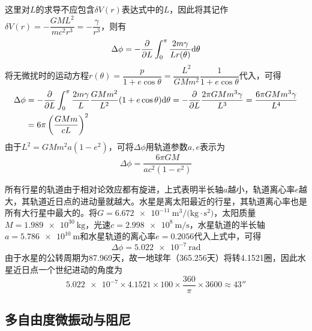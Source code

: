 \begin{solution}
\begin{equation*}
\end{equation*}
这里对$L$的求导不应包含$\delta V(r)$表达式中的$L$，因此将其记作$\delta V(r) = -\dfrac{GML^2}{mc^2r^3} = -\dfrac{\gamma}{r^3}$，则有
\begin{equation*}
	\Delta \phi = -\frac{\partial}{\partial L} \int_0^\pi \frac{2m\gamma}{Lr(\theta)} \mathrm{d} \theta
\end{equation*}
将无微扰时的运动方程$r(\theta) = \dfrac{p}{1+e\cos\theta} = \dfrac{L^2}{GMm^2} \dfrac{1}{1+e\cos\theta}$代入，可得
\begin{align*}
	\Delta \phi & = -\frac{\partial}{\partial L} \int_0^\pi \frac{2m\gamma}{L} \frac{GMm^2}{L^2}(1+e\cos\theta) \mathrm{d} \theta = -\frac{\partial}{\partial L} \frac{2\pi GMm^3\gamma}{L^3} = \frac{6\pi GMm^3\gamma}{L^4} \\
	& = 6\pi \left(\frac{GMm}{cL}\right)^2
\end{align*}
由于$L^2=GMm^2a(1-e^2)$，可将$\Delta \phi$用轨道参数$a, e$表示为
\begin{equation*}
	\Delta \phi = \frac{6\pi GM}{ac^2(1-e^2)}
\end{equation*}

所有行星的轨道由于相对论效应都有旋进，上式表明半长轴$a$越小，轨道离心率$e$越大，其轨道近日点的进动量就越大。水星是离太阳最近的行星，其轨道离心率也是所有大行星中最大的。将$G=\SI{6.672e-11}{\m^3/(\kg\cdot \s^2)}$，太阳质量$M=\SI{1.989e30}{\kg}$，光速$c=\SI{2.998e8}{\m/\s}$，水星轨道的半长轴$a=\SI{5.786e10}{\m}$和水星轨道的离心率$e=0.2056$代入上式中，可得
\begin{equation*}
	\Delta \phi = \SI{5.022e-7}{\radian}
\end{equation*}
由于水星的公转周期为\num{87.969}天，故一地球年（\num{365.256}天）将转\num{4.1521}圈，因此水星近日点一个世纪进动的角度为
\begin{equation*}
	\num{5.022e-7}\times 4.1521 \times 100 \times \frac{360}{\pi} \times 3600 \approx \ang{;;43}
\end{equation*}
\end{solution}

\subsection{多自由度微振动与阻尼}

